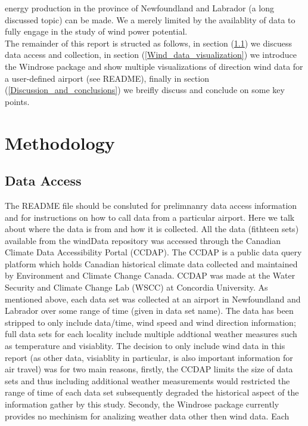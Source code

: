 \documentclass{article}
\begin{document}
energy production in the province of Newfoundland and Labrador (a long discussed topic) can be made. We a merely limited by the availablity of data to fully engage in the study of wind power potential. 
\\
\indent The remainder of this report is structed as follows, in section (\ref{Data_access}) we discuess data access and collection, in section (\ref{Wind_data_visualization}) we introduce the Windrose  
package and show multiple visualizations of direction wind data for a user-defined airport (see README), finally in section (\ref{Discussion_and_conclusions}) we breifly discuss and conclude on some key 
points.      

\section{Methodology}\label{Methodology}

\subsection{Data Access}\label{Data_access}
The README file should be consluted for prelimnanry data access information and for instructions on how to call data from a particular airport. Here we talk about where the data is from and how it is 
collected. All the data (fithteen sets) available from the windData repository was accessed through the Canadian Climate Data Accessibility Portal (CCDAP). The CCDAP is a public data query platform which 
holds Canadian historical climate data collected and maintained by Environment and Climate Change Canada. CCDAP was made at the Water Security and Climate Change Lab (WSCC) at Concordia University. As 
mentioned above, each data set was collected at an airport in Newfoundland and Labrador over some range of time (given in data set name). The data has been stripped to only include data/time, wind speed 
and wind direction information; full data sets for each locality include multiple addtional weather measures such as temperature and visiablity. The decision to only include wind data in this report (as 
other data, visiablity in particular, is also important information for air travel) was for two main reasons, firstly, the CCDAP limits the size of data sets and thus including additional weather 
measurements would restricted the range of time of each data set subsequently degraded the historical aspect of the information gather by this study. Secondy, the Windrose package currently provides no 
mechinism for analizing weather data other then wind data.
\indent Each
\end{document}

